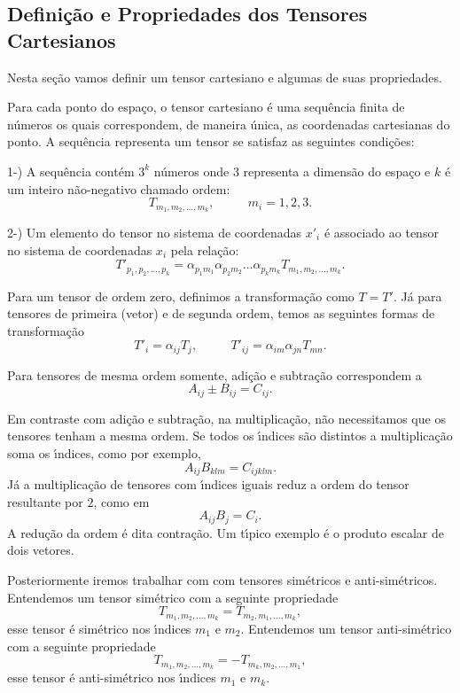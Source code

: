 \subsection{Defini\c{c}\~ao e Propriedades dos Tensores Cartesianos}

Nesta se\c{c}\~ao vamos definir um tensor cartesiano e algumas de
suas propriedades.

Para cada ponto do espa\c{c}o, o tensor cartesiano \'e uma
sequ\^encia
 finita de n\'umeros os quais correspondem, de maneira \'unica, as coordenadas
cartesianas do ponto. A sequ\^encia representa um tensor se
satisfaz as seguintes  condi\c{c}\~oes:

1-) A sequ\^encia cont\'em $3^{k}$ n\'umeros onde $3$ representa a
dimens\~ao do espa\c{c}o e $k$ \'e um inteiro n\~ao-negativo
chamado ordem:
\[T_{m_{1},m_{2},...,m_{k}}, \mbox{   }\mbox{   }\mbox{   }\mbox{   } m_{i}=1,2,3.\]

2-) Um elemento do tensor no sistema de coordenadas $x'_{i}$ \'e
associado ao tensor no sistema de coordenadas $x_{i}$ pela
rela\c{c}\~ao:
\[T'_{p_{1},p_{2},...,p_{k}}=
\alpha_{p_{1}m_{1}}\alpha_{p_{2}m_{2}}...\alpha_{p_{k}m_{k}}T_{m_{1},m_{2},...,m_{k}}.\]

Para um tensor de ordem zero, definimos a transforma\c{c}\~ao como $T=T'$. J\'a para tensores
de primeira (vetor) e de segunda ordem, temos as seguintes formas de transforma\c{c}\~ao
\[T'_{i}=\alpha_{ij}T_{j},\mbox{   }\mbox{   }\mbox{   }\mbox{   }
T'_{ij}=\alpha_{im}\alpha_{jn}T_{mn}.\]

Para tensores de mesma ordem somente, adi\c{c}\~ao e subtra\c{c}\~ao
correspondem a
\[A_{ij} \pm B_{ij}=C_{ij}.\]

Em contraste com adi\c{c}\~ao e subtra\c{c}\~ao, na multiplica\c{c}\~ao, n\~ao
necessitamos que os tensores tenham a
mesma ordem. Se todos os \'\i ndices s\~ao distintos a
multiplica\c{c}\~ao soma os \'\i ndices, como por exemplo,
\[A_{ij}B_{klm}=C_{ijklm}.\]
J\'a a multiplica\c{c}\~ao de tensores com \'\i ndices iguais reduz
a ordem do tensor resultante por $2$, como em
\[A_{ij}B_{j}=C_{i}.\]
A redu\c{c}\~ao da ordem \'e dita contra\c{c}\~ao. Um t\'\i pico
exemplo \'e o produto escalar de dois vetores.

Posteriormente iremos trabalhar com com tensores sim\'etricos e
anti-sim\'etricos. Entendemos um  tensor sim\'etrico com a seguinte
propriedade
\[T_{m_{1},m_{2},...,m_{k}}=T_{m_{2},m_{1},...,m_{k}},\]
esse tensor \'e sim\'etrico nos \'\i ndices $m_{1}$ e
$m_{2}$. Entendemos um  tensor anti-sim\'etrico com a seguinte
propriedade
\[T_{m_{1},m_{2},...,m_{k}}=-T_{m_{k},m_{2},...,m_{1}},\]
esse tensor \'e anti-sim\'etrico nos \'\i ndices $m_{1}$ e $m_{k}$.


